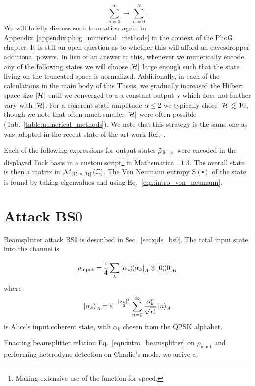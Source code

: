 \begin{equation}
\sum_{n=0}^\infty \rightarrow \sum_{n=0}^N.
\end{equation}
We will briefly discuss such truncation again in Appendix~\ref{appendix:phog_numerical_methods} in the context of the PhoG chapter. It is still an open question \cite{Lin2019} as to whether this will afford an eavesdropper additional powers. In lieu of an answer to this, whenever we numerically encode any of the following states we will choose $\left|\mathcal{H}\right|$ large enough such that the state living on the truncated space is normalized. Additionally, in each of the calculations in the main body of this Thesis, we gradually increased the Hilbert space size $\left|\mathcal{H}\right|$ until we converged to a a constant output $\chi$ which does not further vary with $\left|\mathcal{H}\right|$. For a coherent state amplitude $\alpha \le 2$ we typically chose $\left|\mathcal{H}\right| \lesssim 10$, though we note that often much smaller $\left|\mathcal{H}\right|$ were often possible (Tab.~\ref{table:numerical_methods}). We note that this strategy is the same one as was adopted in the recent state-of-the-art work Ref.~\cite{Lin2019}.

Each of the following expressions for output states $\tilde{\rho}_{\left. \mathbb{B} \; \middle| \; c\right.}$ were encoded in the displayed Fock basis in a custom script\footnote{Making extensive use of the  function for speed.} in Mathematica~$11.3$. The overall state is then a matrix in $\mathcal{M}_{\left|\mathcal{H}\right| \times \left|\mathcal{H}\right|}\left(\mathbb{C}\right)$. The Von Neumann entropy $\text{S}\left(\centerdot\right)$ of the state is found by taking eigenvalues and using Eq.~\ref{eqn:intro_von_neumann}.

\section{Attack BS$0$}
Beamsplitter attack BS$0$ is described in Sec.~\ref{sec:qds_bs0}. The total input state into the channel is

\begin{equation}
\rho_{\text{input}} = \frac{1}{4}\sum_k \dyad{\alpha_k}_A \otimes \dyad{0}_B
\end{equation}
where
\begin{equation}
\ket{\alpha_k}_A = e^{- \frac{\left| \alpha_k \right|^2}{2}} \sum_{n=0}^\infty \frac{\alpha_k^n}{\sqrt{n!}} \ket{n}_A
\end{equation}
is Alice's input coherent state, with $\alpha_k$ chosen from the QPSK alphabet. 

Enacting beamsplitter relation Eq.~\ref{eqn:intro_beamsplitter} on $\rho_{\text{input}}$ and performing heterodyne detection on Charlie's mode, we arrive at

